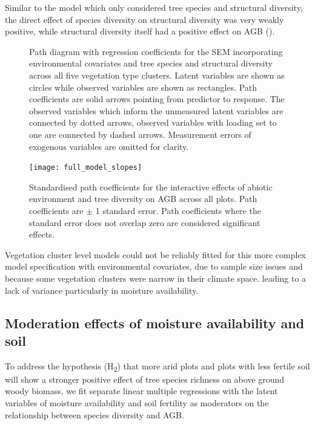 \documentclass[11pt,a4paper]{article}
\begin{document}
Similar to the model which only considered tree species and structural diversity, the direct effect of species diversity on structural diversity was very weakly positive, while structural diversity itself had a positive effect on AGB (\rghb{}). 

\begin{figure}[H]
\centering
	
	\caption{Path diagram with regression coefficients for the SEM incorporating environmental covariates and tree species and structural diversity across all five vegetation type clusters. Latent variables are shown as circles while observed variables are shown as rectangles. Path coefficients are solid arrows pointing from predictor to response. The observed variables which inform the unmeasured latent variables are connected by dotted arrows, observed variables with loading set to one are connected by dashed arrows. Measurement errors of exogenous variables are omitted for clarity.}
	\label{full_mod}
\end{figure}

\begin{figure}[H]
\centering
	\texttt{[image: full\_model\_slopes]}
	\caption{Standardised path coefficients for the interactive effects of abiotic environment and tree diversity on AGB across all plots. Path coefficients are $\pm$ 1 standard error. Path coefficients where the standard error does not overlap zero are considered significant effects.}
	\label{full_model_slopes}
\end{figure}


Vegetation cluster level models could not be reliably fitted for this more complex model specification with environmental covariates, due to sample size issues and because some vegetation clusters were narrow in their climate space. leading to a lack of variance particularly in moisture availability.


\subsection{Moderation effects of moisture availability and soil}

To address the hypothesis (H\textsubscript{2}) that more arid plots and plots with less fertile soil will show a stronger positive effect of tree species richness on above ground woody biomass, we fit separate linear multiple regressions with the latent variables of moisture availability and soil fertility as moderators on the relationship between species diversity and AGB.
\end{document}
